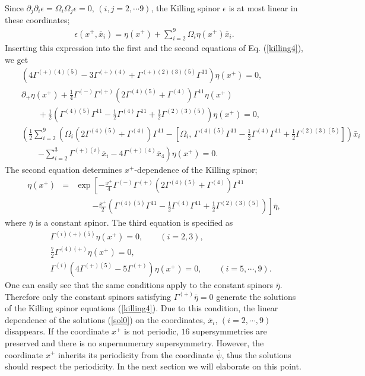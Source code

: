 \documentclass[a4paper,12pt]{article}
\begin{document}
Since $\partial_j\partial_i\epsilon=\Omega_i\Omega_j\epsilon=0,\,(i,j=2,\cdots 9)$, the Killing spinor $\epsilon$ is at most linear in these coordinates; 
\begin{eqnarray}\label{sol0}
\epsilon(x^+,\bar{x}_i)=\eta(x^+)+\sum\limits_{i=2}^9\Omega_i\eta(x^+)\bar{x}_i.
\end{eqnarray}
Inserting this expression into the first and the second equations of Eq. (\ref{killing4}), we get
\begin{eqnarray}
&&\left(4\Gamma^{(+)(4)(5)}-3\Gamma^{(+)(4)}+\Gamma^{(+)(2)(3)(5)}\Gamma^{11}\right)\eta(x^+)=0,\nonumber\\
&&\partial_+\eta(x^+)+\frac{1}{4}\Gamma^{(-)}\Gamma^{(+)}\left(2\Gamma^{(4)(5)}+\Gamma^{(4)}\right)\Gamma^{11}\eta(x^+)\nonumber\\
&&\qquad+\frac{1}{2}\left(\Gamma^{(4)(5)}\Gamma^{11}-\frac{1}{2}\Gamma^{(4)}\Gamma^{11}+\frac{1}{2}\Gamma^{(2)(3)(5)}\right)\eta(x^+)=0,\nonumber\\
&&\left(\frac{1}{2}\sum\limits_{i=2}^{9}\left(\Omega_i\left(2\Gamma^{(4)(5)}+\Gamma^{(4)}\right)\Gamma^{11}-\left[\Omega_i,\,\Gamma^{(4)(5)}\Gamma^{11}-\frac{1}{2}\Gamma^{(4)}\Gamma^{11}+\frac{1}{2}\Gamma^{(2)(3)(5)}\right]\right)\bar{x}_i\right.\nonumber\\
&&\qquad\left.-\sum\limits_{i=2}^{3}\Gamma^{(+)(i)}\bar{x}_i-
4\Gamma^{(+)(4)}\bar{x}_4\right)\eta(x^+)=0.
\end{eqnarray}
The second equation determines $x^+$-dependence of the Killing spinor; 
\begin{eqnarray}\label{sol1}
\eta(x^+)&=&\exp\left[{-\frac{x^+}{4}\Gamma^{(-)}\Gamma^{(+)}\left(2\Gamma^{(4)(5)}+\Gamma^{(4)}\right)\Gamma^{11}}\right.\nonumber\\
&&\qquad\left.{-\frac{x^+}{2}\left(\Gamma^{(4)(5)}\Gamma^{11}-\frac{1}{2}\Gamma^{(4)}\Gamma^{11}+\frac{1}{2}\Gamma^{(2)(3)(5)}\right)}\right]\bar{\eta},
\end{eqnarray}
where $\bar{\eta}$ is a constant spinor.
The third equation is specified as
\begin{eqnarray}\label{killing5}
&&\Gamma^{(i)(+)(5)}\eta(x^+)=0,\qquad (i=2,3),\nonumber\\
&&\frac{7}{2}\Gamma^{(4)(+)}\eta(x^+)=0,\nonumber\\
&&\Gamma^{(i)}\left(4\Gamma^{(+)(5)}-5\Gamma^{(+)}\right)\eta(x^+)=0,\qquad (i=5,\cdots, 9).
\end{eqnarray}
One can easily see that the same conditions apply to the constant spinors $\bar{\eta}$. Therefore only the constant spinors satisfying $\Gamma^{(+)}\bar{\eta}=0$ generate the solutions of the Killing spinor equations (\ref{killing4}). Due to this condition, the linear dependence of the solutions (\ref{sol0}) on the coordinates, $\bar{x}_i,\,(i=2,\cdots, 9)$ disappears. If the coordinate $x^+$ is not periodic, $16$ supersymmetries are preserved and there is no supernumerary supersymmetry. However, the coordinate $x^+$ inherits its periodicity from the coordinate $\bar{\psi}$, thus the solutions should respect the periodicity. In the next section we will elaborate on this point.   
\end{document}
